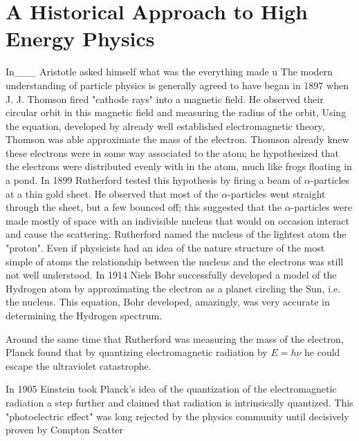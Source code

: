 \section{A Historical Approach to High Energy Physics}
 In___ Aristotle asked himself what was the everything made u
 The modern understanding of particle physics is generally
 agreed to have began in 1897
 when J. J. Thomson fired "cathode rays" into a magnetic field. 
He observed their circular orbit in this magnetic field and measuring
the radius of the orbit, %
 Using the equation, %
 developed by already well established electromagnetic theory, Thomson
 was able approximate the mass of the electron. 
 Thomson already knew these electrons were in some way associated
 to the atom; he hypothesized that the electrons were distributed
 evenly with in the atom, much like frogs floating in a pond.
 In 1899 Rutherford tested this hypothesis by firing a beam of 
 $\alpha$-particles at a thin gold sheet. He observed that most of the
 $\alpha$-particles went straight through the sheet, but a few bounced
 off; this suggested that the $\alpha$-particles were made mostly of 
 space with an indivisible nucleus that would on occasion interact and
 cause the scattering. Rutherford named the nucleus of the lightest
 atom the "proton". Even if physicists had an idea of the nature structure
 of the most simple of atoms the relationship between the nucleus and the
 electrons was still not well understood. In 1914 Niels Bohr successfully
 developed a model of the Hydrogen atom by approximating the electron
 as a planet circling the Sun, i.e. the nucleus. This equation, %
Bohr developed, amazingly, was very accurate in determining the 
Hydrogen spectrum. 

Around the same time that Rutherford was measuring the mass of the
electron, Planck found that by quantizing electromagnetic radiation by
$E=h\nu$ he could escape the ultraviolet catastrophe.%

In 1905 Einstein took Planck's idea of the quantization of the electromagnetic
radiation a step further and claimed that radiation is intrinsically quantized.
This "photoelectric effect" was long rejected by the physics community until
decisively proven by Compton Scatter
